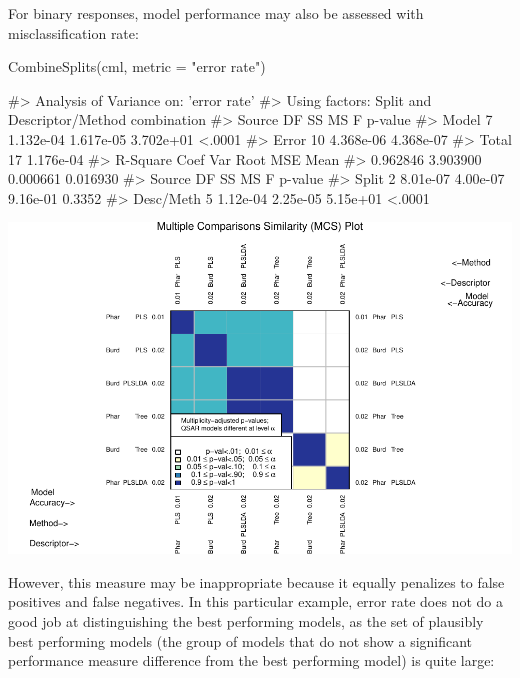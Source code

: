 For binary responses, model performance may also be assessed with
misclassification rate:

\begin{Schunk}
\begin{Sinput}
CombineSplits(cml, metric = "error rate")
\end{Sinput}
\begin{Soutput}
#>    Analysis of Variance on: 'error rate'
#>  Using factors: Split and Descriptor/Method combination
#> Source    DF          SS          MS           F   p-value   
#> Model      7   1.132e-04   1.617e-05   3.702e+01    <.0001   
#> Error     10   4.368e-06   4.368e-07   
#> Total     17   1.176e-04   
#>       R-Square   Coef Var   Root MSE       Mean   
#>       0.962846   3.903900   0.000661   0.016930   
#> Source       DF         SS         MS          F   p-value   
#> Split         2   8.01e-07   4.00e-07   9.16e-01    0.3352   
#> Desc/Meth     5   1.12e-04   2.25e-05   5.15e+01    <.0001
\end{Soutput}

\includegraphics{chemmodlabRJournal_files/figure-latex/CombineSplits_er-1} \end{Schunk}

However, this measure may be inappropriate because it equally penalizes
to false positives and false negatives. In this particular example,
error rate does not do a good job at distinguishing the best performing
models, as the set of plausibly best performing models (the group of
models that do not show a significant performance measure difference
from the best performing model) is quite large:

